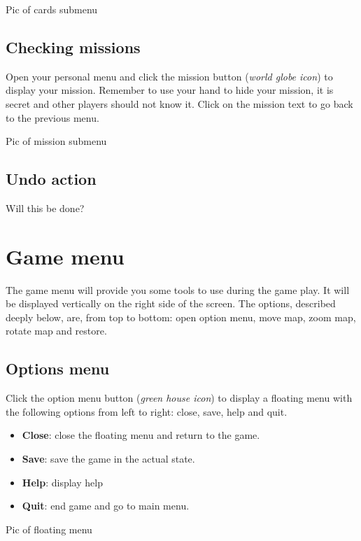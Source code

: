 \documentclass[12pt,a4paper]{article}
\begin{document}
\begin{todo}[Alberto]
  Pic of cards submenu
\end{todo}

\subsection{Checking missions}
Open your personal menu and click the mission button ({\it world globe icon}) to display your mission. Remember to use your hand to hide your mission, it is secret and other players should not know it. Click on the mission text to go back to the previous menu.

\begin{todo}[Alberto]
  Pic of mission submenu
\end{todo}

\subsection{Undo action}
\begin{todo}[Alberto]
Will this be done?
\end{todo}

\section{Game menu}
The game menu will provide you some tools to use during the game play. It will be displayed vertically on the right side of the screen. The options, described deeply below, are, from top to bottom: open option menu, move map, zoom map, rotate map and restore.

\subsection{Options menu}
Click the option menu button ({\it green house icon}) to display a floating menu with the following options from left to right: close, save, help and quit.

\begin{itemize}
\item {\bf Close}: close the floating menu and return to the game.
\item {\bf Save}: save the game in the actual state.
\item {\bf Help}: display help
\item {\bf Quit}: end game and go to main menu.
\end{itemize}

\begin{todo}[Alberto]
  Pic of floating menu
\end{todo}
\end{document}
